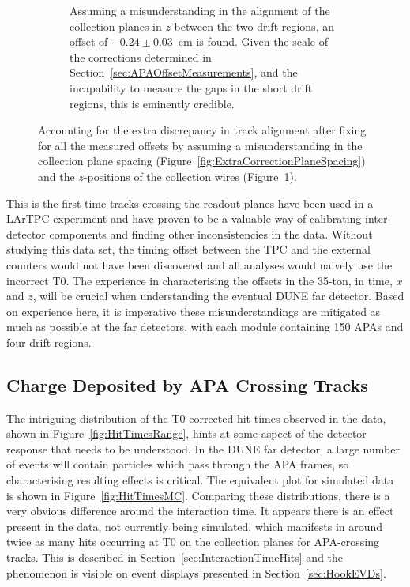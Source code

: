 \begin{figure}
\begin{subfigure}[t]{0.48\linewidth}
    \caption{Assuming a misunderstanding in the alignment of the collection planes in $z$ between the two drift regions, an offset of $-0.24\pm0.03$~cm is found.  Given the scale of the corrections determined in Section~\ref{sec:APAOffsetMeasurements}, and the incapability to measure the gaps in the short drift regions, this is eminently credible.}
    \label{fig:ExtraCorrectionWire}
  \end{subfigure}
  \caption[Accounting for the extra discrepancy in track alignment after fixing for all the measured offsets by assuming a misunderstanding in the collection plane spacing and the $z$-positions of the collection wires.]{Accounting for the extra discrepancy in track alignment after fixing for all the measured offsets by assuming a misunderstanding in the collection plane spacing (Figure~\ref{fig:ExtraCorrectionPlaneSpacing}) and the $z$-positions of the collection wires (Figure~\ref{fig:ExtraCorrectionWire}).}
  \label{fig:ExtraCorrections}
\end{figure}

This is the first time tracks crossing the readout planes have been used in a LArTPC experiment and have proven to be a valuable way of calibrating inter-detector components and finding other inconsistencies in the data.  Without studying this data set, the timing offset between the TPC and the external counters would not have been discovered and all analyses would naively use the incorrect T0.  The experience in characterising the offsets in the 35-ton, in time, $x$ and $z$, will be crucial when understanding the eventual DUNE far detector.  Based on experience here, it is imperative these misunderstandings are mitigated as much as possible at the far detectors, with each module containing 150 APAs and four drift regions.

\subsection{Charge Deposited by APA Crossing Tracks}\label{sec:APACrossingCharge}

The intriguing distribution of the T0-corrected hit times observed in the data, shown in Figure~\ref{fig:HitTimesRange}, hints at some aspect of the detector response that needs to be understood.  In the DUNE far detector, a large number of events will contain particles which pass through the APA frames, so characterising resulting effects is critical.  The equivalent plot for simulated data is shown in Figure~\ref{fig:HitTimesMC}.  Comparing these distributions, there is a very obvious difference around the interaction time.  It appears there is an effect present in the data, not currently being simulated, which manifests in around twice as many hits occurring at T0 on the collection planes for APA-crossing tracks.  This is described in Section~\ref{sec:InteractionTimeHits} and the phenomenon is visible on event displays presented in Section~\ref{sec:HookEVDs}.

